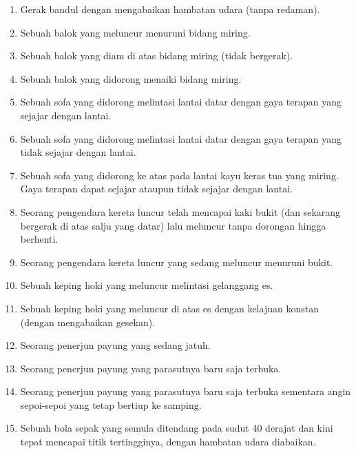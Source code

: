 \begin{enumerate}
\begin{enumerate}
\item \label{exc:odePendulum-20}\label{dom-start}Gerak bandul dengan mengabaikan
hambatan udara (tanpa redaman). \hasananswer 
\item \label{exc:odePendulum-21}Sebuah balok yang meluncur menuruni bidang
miring. \hasananswer 
\item \label{exc:odePendulum-22}Sebuah balok yang diam di atas bidang miring
(tidak bergerak). \hasasolution 
\item Sebuah balok yang didorong menaiki bidang miring.
\item \label{exc:odePendulum-23}Sebuah sofa yang didorong melintasi lantai
datar dengan gaya terapan yang sejajar dengan lantai. \hasananswer 
\item \label{exc:odePendulum-24}Sebuah sofa yang didorong melintasi lantai
datar dengan gaya terapan yang tidak sejajar dengan lantai. \hasasolution 
\item \label{exc:odePendulum-25}Sebuah sofa yang didorong ke atas pada
lantai kayu keras tua yang miring. Gaya terapan dapat sejajar ataupun
tidak sejajar dengan lantai. \hasananswer 
\item \label{exc:odePendulum-26}Seorang pengendara kereta luncur telah
mencapai kaki bukit (dan sekarang bergerak di atas salju yang datar)
lalu meluncur tanpa dorongan hingga berhenti. \hasananswer 
\item \label{exc:odePendulum-27}Seorang pengendara kereta luncur yang sedang
meluncur menuruni bukit. \hasananswer 
\item \label{exc:odePendulum-28}Sebuah keping hoki yang meluncur melintasi
gelanggang es. \hasananswer 
\item \label{dom-end}Sebuah keping hoki yang meluncur di atas es dengan
kelajuan konstan (dengan mengabaikan gesekan).
\item \label{exc:odePendulum-29}\label{vert-start}Seorang penerjun payung
yang sedang jatuh. \hasananswer 
\item \label{exc:odePendulum-30}Seorang penerjun payung yang parasutnya
baru saja terbuka. \hasasolution 
\item \label{exc:odePendulum-31}Seorang penerjun payung yang parasutnya
baru saja terbuka sementara angin sepoi-sepoi yang tetap bertiup ke
samping. \hasananswer 
\item \label{exc:odePendulum-32}Sebuah bola sepak yang semula ditendang
pada sudut 40 derajat dan kini tepat mencapai titik tertingginya,
dengan hambatan udara diabaikan. \hasananswer 

\end{enumerate}
\end{enumerate}
